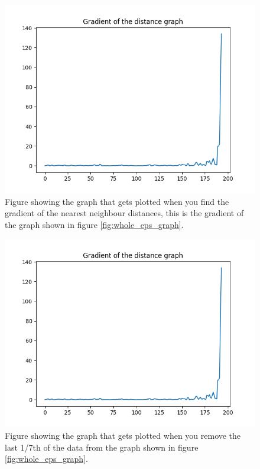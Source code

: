 \begin{figure}[h]
    \centering
    \includegraphics[width=\textwidth]{figures/eps_finder_graph_gradient.png}
    \caption{Figure showing the graph that gets plotted when you find the gradient of the nearest neighbour distances, this is the gradient of the graph shown in figure \ref{fig:whole_eps_graph}.}
    \label{fig:gradient_eps_graph}
\end{figure}

\begin{figure}[h]
    \centering
    \includegraphics[width=\textwidth]{figures/eps_finder_graph_gradient.png}
    \caption{Figure showing the graph that gets plotted when you remove the last 1/7th of the data from the graph shown in figure \ref{fig:whole_eps_graph}.}
    \label{fig:cut_eps_graph}
\end{figure}

